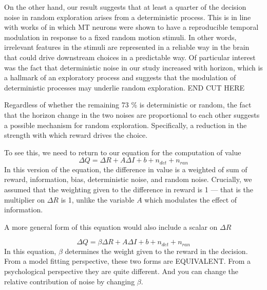 \documentclass[12pt]{article}
\begin{document}
	On the other hand, our result suggests that at least a quarter of the decision noise in random exploration arises from a deterministic process. This is in line with works of \citep{Bair1996} in which MT neurons were shown to have a reproducible temporal modulation in response to a fixed random motion stimuli. In other words, irrelevant features in the stimuli are represented in a reliable way in the brain that could drive downstream choices in a predictable way.  Of particular interest was the fact that deterministic noise in our study increased with horizon, which is a hallmark of an exploratory process and suggests that the modulation of deterministic processes may underlie random exploration.  
END CUT HERE 

			
	
	Regardless of whether the remaining 73 \% is deterministic or random, the fact that the horizon change in the two noises are proportional to each other suggests a possible mechanism for random exploration. Specifically, a reduction in the strength with which reward drives the choice. 
	
	To see this, we need to return to our equation for the computation of value
		\begin{equation}
	    \Delta Q = \Delta R + A \Delta I + b + n_{det} + n_{ran}
	\end{equation}
	In this version of the equation, the difference in value is a weighted of sum of reward, information, bias, deterministic noise,  and random noise.  Crucially, we assumed that the weighting given to the difference in reward is 1 --- that is the multiplier on $\Delta R$ is 1, unlike the variable $A$ which modulates the effect of information.  
	
	A more general form of this equation would also include a scalar on $\Delta R$
	
	\begin{equation}
	    \Delta Q = \beta \Delta R + A \Delta I + b + n_{det} + n_{ran}
	\end{equation}
	In this equation, $\beta$ determines the weight given to the reward in the decision.  From a model fitting perspective, these two forms are EQUIVALENT. From a psychological perspective they are quite different.  And you can change the relative contribution of noise by changing $\beta$.
	
\end{document}
